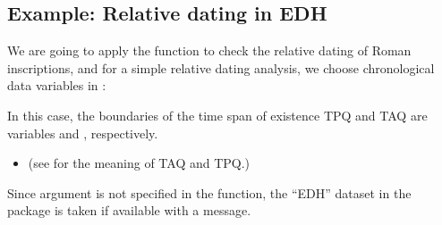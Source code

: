 \documentclass[a4paper,12pt,english]{sphinxhowto}
\begin{document}
\subsection{Example: Relative dating in EDH}
\label{\detokenize{EDHVariables:example-relative-dating-in-edh}}\label{\detokenize{EDHVariables:rel-dat}}
We are going to apply the  function to check the relative dating of Roman inscriptions, and
for a simple relative dating analysis, we choose chronological data variables in :

\begin{sphinxVerbatim}[commandchars=\\\{\},formatcom=\footnotesize]
  
\end{sphinxVerbatim}

In this case, the boundaries of the time span of existence TPQ and TAQ are variables  and ,
respectively.
\begin{itemize}
\item {} 
(see {\hyperref[\detokenize{Uncertainty:tapq}]{}} for the meaning of TAQ and TPQ.)

\end{itemize}


Since argument  is not specified in the function, the “EDH” dataset in the  package is taken if available
with a  message.
\end{document}
